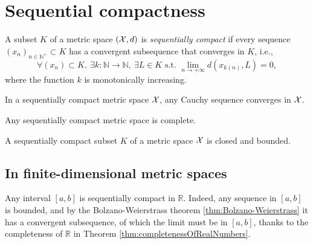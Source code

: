 \section{Sequential compactness}
\label{sec:sequentialCompactness}


\begin{defn}
  \label{def:sequentialCompactness}
  A subset $K$ of a metric space $({\cal X},d)$
  is \emph{sequentially compact}
  if every sequence $(x_n)_{n\in \mathbb{N}^+}\subset K$ has
  a convergent subsequence that converges in $K$, i.e., 
  \begin{equation}
    \label{eq:sequentialCompactness}
    \forall (x_n)\subset K,\
    \exists k: \mathbb{N}\rightarrow \mathbb{N},\ \exists L\in K
    \text{ s.t. }
    \lim_{n\rightarrow +\infty} d(x_{k(n)}, L)=0, 
  \end{equation}
  where the function $k$ is monotonically increasing. 
\end{defn}


\begin{lem}
  \label{lem:CauchySeqInCompactMetric}
  In a sequentially compact metric space ${\cal X}$,   
  any Cauchy sequence converges in ${\cal X}$.
\end{lem}


\begin{coro}
  \label{coro:compactnessImpliesCompleteness}
  Any sequentially compact metric space is complete.
\end{coro}

\begin{lem}
  \label{lem:compactSetsIsClosedAndBounded}
  A sequentially compact subset $K$ of a metric space ${\cal X}$
  is closed and bounded.
\end{lem}




\subsection{In finite-dimensional metric spaces}

\begin{exm}
  Any interval $[a,b]$ is sequentially compact in $\mathbb{R}$.
  Indeed, any sequence in $[a,b]$
  is bounded, and by the Bolzano-Weierstrass theorem
  \ref{thm:Bolzano-Weierstrass}
  it has a convergent subsequence,
  of which the limit must be in $[a,b]$, 
  thanks to the completeness of $\mathbb{R}$
  in Theorem \ref{thm:completenessOfRealNumbers}.
\end{exm}


